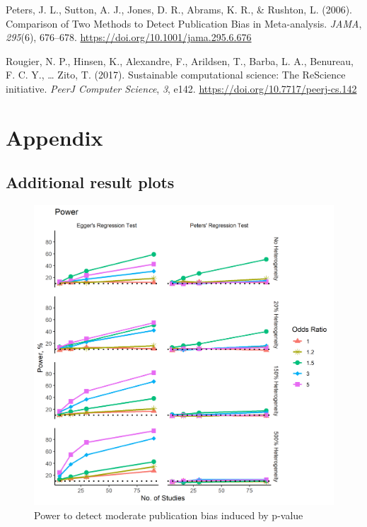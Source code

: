 \documentclass[
  english,
  doc,floatsintext,draftall]{apa6}
\begin{document}
\leavevmode\hypertarget{ref-peters_comparison_2006}{}%
Peters, J. L., Sutton, A. J., Jones, D. R., Abrams, K. R., \& Rushton, L. (2006). Comparison of Two Methods to Detect Publication Bias in Meta-analysis. \emph{JAMA}, \emph{295}(6), 676--678. \url{https://doi.org/10.1001/jama.295.6.676}

\leavevmode\hypertarget{ref-rougier_sustainable_2017-1}{}%
Rougier, N. P., Hinsen, K., Alexandre, F., Arildsen, T., Barba, L. A., Benureau, F. C. Y., \ldots{} Zito, T. (2017). Sustainable computational science: The ReScience initiative. \emph{PeerJ Computer Science}, \emph{3}, e142. \url{https://doi.org/10.7717/peerj-cs.142}

\FloatBarrier
\newpage

\hypertarget{appendix}{%
\section{Appendix}\label{appendix}}

\hypertarget{additional-result-plots}{%
\subsection{Additional result plots}\label{additional-result-plots}}

\begin{figure}
\includegraphics[width=400pt]{../figures/power_p_moderate} \caption{Power to detect moderate publication bias induced by p-value}\label{fig:unnamed-chunk-9}
\end{figure}
\end{document}
